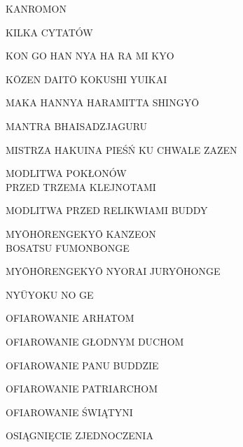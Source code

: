 \par\noindent KANROMON \dotfill \makebox[1.0cm][r]{\pageref{kanromon}}
\par\noindent KILKA CYTATÓW \dotfill \makebox[1.0cm][r]{\pageref{cytaty}}
\par\noindent KON GO HAN NYA HA RA MI KYO \dotfill \makebox[1.0cm][r]{\pageref{kon_go_han_nya_ha_ra_mi_kyo}}
\par\noindent K\=OZEN DAIT\=O KOKUSHI YUIKAI \dotfill \makebox[1.0cm][r]{\pageref{kozen_daito_kokushi_yuikai}}
\par\noindent MAKA HANNYA HARAMITTA SHINGY\=O \dotfill \makebox[1.0cm][r]{\pageref{hannya_shin_gyo}}
\par\noindent MANTRA BHAISADZJAGURU \dotfill \makebox[1.0cm][r]{\pageref{mantra_bhaisadzjaguru}}
\par\noindent MISTRZA HAKUINA PIEŚŃ KU CHWALE ZAZEN \dotfill \makebox[1.0cm][r]{\pageref{mistrza_hakuina_piesn}}
\par\noindent MODLITWA POKŁONÓW\\ PRZED TRZEMA KLEJNOTAMI \dotfill \makebox[1.0cm][r]{\pageref{trzy_skarby}}
\par\noindent MODLITWA PRZED RELIKWIAMI BUDDY \dotfill \makebox[1.0cm][r]{\pageref{przed_relikwiami}}
\par\noindent MY\=OH\=ORENGEKY\=O KANZEON\\ BOSATSU FUMONBONGE \dotfill \makebox[1.0cm][r]{\pageref{myohorengekyo_kanzeonbosatsu_fumonbonge}}
\par\noindent MY\=OH\=ORENGEKY\=O NYORAI JURY\=OHONGE \dotfill \makebox[1.0cm][r]{\pageref{myohorengekyo_nyorai_juryohonge}}
\par\noindent NY\=UYOKU NO GE \dotfill \makebox[1.0cm][r]{\pageref{nyuyoku_no_ge}}
\par\noindent OFIAROWANIE ARHATOM \dotfill \makebox[1.0cm][r]{\pageref{ofiarowanie_arhatom}}
\par\noindent OFIAROWANIE GŁODNYM DUCHOM \dotfill \makebox[1.0cm][r]{\pageref{ofiarowanie_glodnym_duchom}}
\par\noindent OFIAROWANIE PANU BUDDZIE \dotfill \makebox[1.0cm][r]{\pageref{ofiarowanie_panu_buddzie}}
\par\noindent OFIAROWANIE PATRIARCHOM \dotfill \makebox[1.0cm][r]{\pageref{ofiarowanie_patriarchom}}
\par\noindent OFIAROWANIE ŚWIĄTYNI \dotfill \makebox[1.0cm][r]{\pageref{ofiarowanie_swiatyni}}
\par\noindent OSIĄGNIĘCIE ZJEDNOCZENIA \dotfill \makebox[1.0cm][r]{\pageref{osiagniecie_zjednoczenia}}
